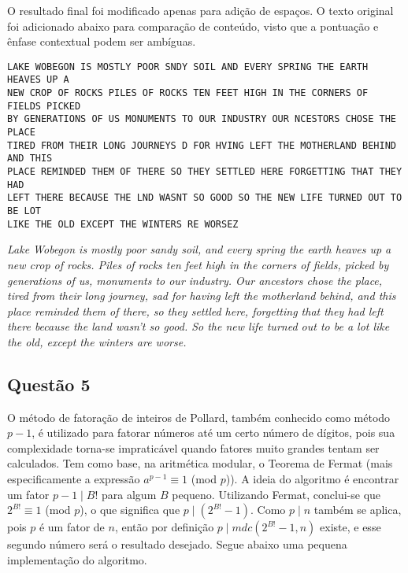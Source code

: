 \documentclass{../sftex/sftex}
\begin{document}
O resultado final foi modificado apenas para adição de espaços. O texto
original foi adicionado abaixo para comparação de conteúdo, visto que a
pontuação e ênfase contextual podem ser ambíguas.

\begin{verbatim}
LAKE WOBEGON IS MOSTLY POOR SNDY SOIL AND EVERY SPRING THE EARTH HEAVES UP A
NEW CROP OF ROCKS PILES OF ROCKS TEN FEET HIGH IN THE CORNERS OF FIELDS PICKED
BY GENERATIONS OF US MONUMENTS TO OUR INDUSTRY OUR NCESTORS CHOSE THE PLACE
TIRED FROM THEIR LONG JOURNEYS D FOR HVING LEFT THE MOTHERLAND BEHIND AND THIS
PLACE REMINDED THEM OF THERE SO THEY SETTLED HERE FORGETTING THAT THEY HAD
LEFT THERE BECAUSE THE LND WASNT SO GOOD SO THE NEW LIFE TURNED OUT TO BE LOT
LIKE THE OLD EXCEPT THE WINTERS RE WORSEZ
\end{verbatim}

\textit{Lake Wobegon is mostly poor sandy soil, and every spring the earth
heaves up a new crop of rocks. Piles of rocks ten feet high in the corners of
fields, picked by generations of us, monuments to our industry. Our ancestors
chose the place, tired from their long journey, sad for having left the
motherland behind, and this place reminded them of there, so they settled
here, forgetting that they had left there because the land wasn't so good.
So the new life turned out to be a lot like the old, except the winters are
worse.}~\cite{keillor1985lake}

\subsection*{Questão 5}

O método de fatoração de inteiros de Pollard, também conhecido como método
$p -1$, é utilizado para fatorar números até um certo número de dígitos, pois
sua complexidade torna-se impraticável quando fatores muito grandes tentam ser
calculados. Tem como base, na aritmética modular, o Teorema de Fermat (mais
especificamente a expressão $a^{p-1} \equiv 1$ (mod $p$)). A ideia do
algoritmo é encontrar um fator $p - 1 \mid B$! para algum $B$ pequeno.
Utilizando Fermat, conclui-se que $2^{B!} \equiv 1$ (mod $p$), o que significa
que $p \mid (2^{B!} - 1)$. Como $p \mid n$ também se aplica, pois $p$ é um
fator de $n$, então por definição $p \mid mdc(2^{B!} - 1, n)$ existe, e esse
segundo número será o resultado desejado. Segue abaixo uma pequena
implementação do algoritmo.
\end{document}
